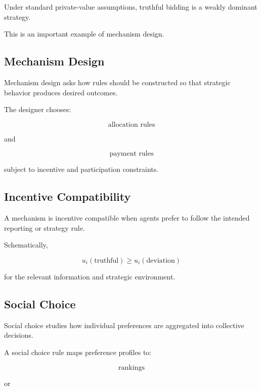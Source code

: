 Under standard private-value assumptions, truthful bidding is a weakly
dominant strategy.

This is an important example of mechanism design.

\subsection{Mechanism Design}
\label{subsec:mechanism-design}

Mechanism design asks how rules should be constructed so that strategic
behavior produces desired outcomes.

The designer chooses:

\[
\boxed{
\text{allocation rules}
}
\]

and

\[
\boxed{
\text{payment rules}
}
\]

subject to incentive and participation constraints.

\subsection{Incentive Compatibility}
\label{subsec:incentive-compatibility}

A mechanism is incentive compatible when agents prefer to follow the intended
reporting or strategy rule.

Schematically,

\[
\boxed{
u_i(\text{truthful})
\geq
u_i(\text{deviation})
}
\]

for the relevant information and strategic environment.

\subsection{Social Choice}
\label{subsec:social-choice}

Social choice studies how individual preferences are aggregated into
collective decisions.

A social choice rule maps preference profiles to:

\[
\boxed{
\text{rankings}
}
\]

or

